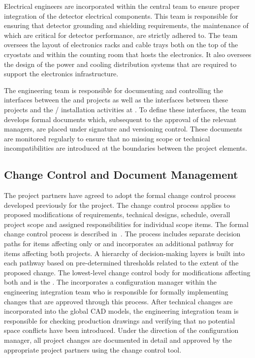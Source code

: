 Electrical engineers are incorporated within the central  
team to ensure proper integration of the detector electrical 
components.  This team is responsible for ensuring that detector 
grounding and shielding requirements, the maintenance of which are 
critical for detector performance, are strictly adhered to.  The 
team oversees the layout of electronics racks and cable trays both 
on the top of the cryostats and within the  counting room 
that hosts the  electronics.  It also oversees the design 
of the power and cooling distribution systems that are required to 
support the electronics infrastructure.

The  engineering team is responsible for documenting and
controlling the interfaces between the  and  
projects as well as the interfaces between these projects and the 
/  installation activities at .  
To define these interfaces, the  team develops formal 
documents which, subsequent to the approval of the relevant managers, 
are placed under signature and versioning control.  These documents 
are monitored regularly to ensure that no missing scope or technical 
incompatibilities are introduced at the boundaries between the project elements.

\subsection{Change Control and Document Management}
\label{sec:dune_changecontrol}

The  project partners have agreed to adopt 
the formal change control process developed previously for the 
 project.  The change control process applies to 
proposed modifications of requirements, technical designs, 
schedule, overall project scope and assigned responsibilities 
for individual scope items.  The formal  
change control process is described in~.  The 
process includes separate decision paths for items affecting 
only  or  and incorporates an additional 
pathway for items affecting both projects.  A hierarchy of 
decision-making layers is built into each pathway based on 
pre-determined thresholds related to the extent of the proposed 
change.  The lowest-level change control body for modifications 
affecting both  and  is the .  
The  incorporates a configuration manager within the 
engineering integration team who is responsible for formally 
implementing changes that are approved through this process.  
After technical changes are incorporated into the global \threed 
CAD models, the engineering integration team is responsible for 
checking production drawings and verifying that no potential 
space conflicts have been introduced.  Under the direction of 
the configuration manager, all project changes are documented 
in detail and approved by the appropriate project partners using 
the  change control tool.

